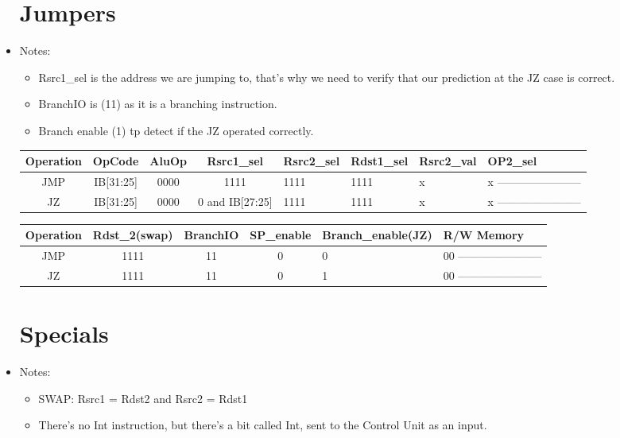 \documentclass[12pt]{report}
\begin{document}
\begin{itemize}
        \section{Jumpers}
        \item Notes:
        \begin{itemize}
            \item Rsrc1_sel is the address we are jumping to, that's why we need to verify that our prediction at the JZ case is correct.
            \item BranchIO is (11) as it is a branching instruction.
            \item Branch enable (1) tp detect if the JZ operated correctly.
        \end{itemize}

        \begin{center}
        \begin{tabular}{||c| c| c| c| p{40mm}||} 
        \hline
        Operation & OpCode & AluOp & Rsrc1_sel & Rsrc2_sel & Rdst1_sel & Rsrc2_val & OP2_sel  \\ [0.5ex] 
        \hline\hline
        JMP & IB[31:25] & 0000 & 1111 & 1111 & 1111 & x & x ----------------------- \\
        \hline
        JZ & IB[31:25] & 0000 & 0 and IB[27:25] & 1111 & 1111 & x & x ----------------------- \\
        \hline
        \end{tabular}
        \end{center}

        \begin{center}
        \begin{tabular}{||c| c| c| c| p{40mm}||} 
        \hline
        Operation & Rdst_2(swap) & BranchIO & SP_enable & Branch_enable(JZ) & R/W Memory  \\ [0.5ex] 
        \hline\hline
        JMP & 1111 & 11 & 0 & 0 & 00 ----------------------- \\
        \hline
        JZ & 1111 & 11 & 0 & 1 & 00 ----------------------- \\
        \hline
        \end{tabular}
        \end{center}


        \section{Specials}
        \item Notes:
        \begin{itemize}
            \item SWAP: Rsrc1 = Rdst2 and Rsrc2 = Rdst1
            \item There's no Int instruction, but there's a bit called Int, sent to the Control Unit as an input.
        \end{itemize}


\end{itemize}
\end{document}
